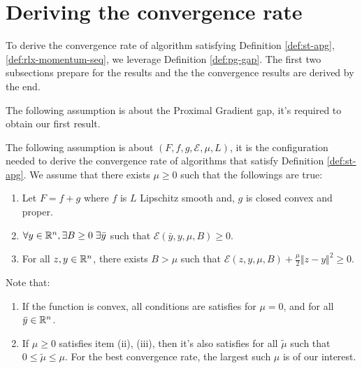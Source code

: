 \documentclass[12pt]{article}
\begin{document}
\section{Deriving the convergence rate}
    To derive the convergence rate of algorithm satisfying Definition \ref{def:st-apg}, \ref{def:rlx-momentum-seq}, we leverage Definition \ref{def:pg-gap}. 
    The first two subsections prepare for the results and the the convergence results are derived by the end. 
    \par
    The following assumption is about the Proximal Gradient gap, it's required to obtain our first result. 
    \begin{assumption}\label{ass:for-cnvg}
        The following assumption is about $(F, f, g, \mathcal E, \mu, L)$, it is the configuration needed to derive the convergence rate of algorithms that satisfy Definition \ref{def:st-apg}. 
        We assume that there exists $\mu \ge 0$ such that the followings are true: 
        \begin{enumerate}[nosep]
            \item Let $F = f + g$ where $f$ is $L$ Lipschitz smooth and, $g$ is closed convex and proper.
            \item $\forall y \in \mathbb R^n, \exists B \ge 0\; \exists \bar y$ such that $\mathcal E(\bar y, y, \mu, B) \ge 0$. 
            \item For all $z, y \in \mathbb R^n$, there exists $B > \mu$ such that $\mathcal E(z, y, \mu, B) + \frac{\mu}{2}\Vert z - y\Vert^2 \ge 0$.   
        \end{enumerate}
    \end{assumption}
    \begin{remark}
        Note that:
        \begin{enumerate}
            \item If the function is convex, all conditions are satisfies for $\mu = 0$, and for all $\bar y \in \mathbb R^n$. 
            \item If $\mu \ge 0$ satisfies item (ii), (iii), then it's also satisfies for all $\tilde \mu$ such that $0 \le \tilde \mu \le \mu$. For the best convergence rate, the largest such $\mu$ is of our interest. 
        \end{enumerate}
        
        
    \end{remark}
\end{document}
